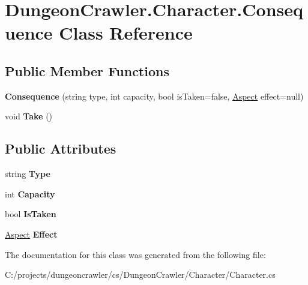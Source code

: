 \hypertarget{class_dungeon_crawler_1_1_character_1_1_consequence}{}\section{Dungeon\+Crawler.\+Character.\+Consequence Class Reference}
\label{class_dungeon_crawler_1_1_character_1_1_consequence}
\subsection*{Public Member Functions}
\begin{DoxyCompactItemize}
\item 
\hypertarget{class_dungeon_crawler_1_1_character_1_1_consequence_a431c8a66e72ae85fac1faebc6d4068a0}{}{\bfseries Consequence} (string type, int capacity, bool is\+Taken=false, \hyperlink{class_dungeon_crawler_1_1_core_1_1_aspect}{Aspect} effect=null)\label{class_dungeon_crawler_1_1_character_1_1_consequence_a431c8a66e72ae85fac1faebc6d4068a0}

\item 
\hypertarget{class_dungeon_crawler_1_1_character_1_1_consequence_ad9944b48d59878f68d5339ba5add1db5}{}void {\bfseries Take} ()\label{class_dungeon_crawler_1_1_character_1_1_consequence_ad9944b48d59878f68d5339ba5add1db5}

\end{DoxyCompactItemize}
\subsection*{Public Attributes}
\begin{DoxyCompactItemize}
\item 
\hypertarget{class_dungeon_crawler_1_1_character_1_1_consequence_afc2e03283729c13bb9971390d382d517}{}string {\bfseries Type}\label{class_dungeon_crawler_1_1_character_1_1_consequence_afc2e03283729c13bb9971390d382d517}

\item 
\hypertarget{class_dungeon_crawler_1_1_character_1_1_consequence_ab6931c76cc48bf013f71a7128df9decf}{}int {\bfseries Capacity}\label{class_dungeon_crawler_1_1_character_1_1_consequence_ab6931c76cc48bf013f71a7128df9decf}

\item 
\hypertarget{class_dungeon_crawler_1_1_character_1_1_consequence_ab01e2cf751dff41dc90dd550991e8dda}{}bool {\bfseries Is\+Taken}\label{class_dungeon_crawler_1_1_character_1_1_consequence_ab01e2cf751dff41dc90dd550991e8dda}

\item 
\hypertarget{class_dungeon_crawler_1_1_character_1_1_consequence_aef0467da62c63e37bf27527dded9871f}{}\hyperlink{class_dungeon_crawler_1_1_core_1_1_aspect}{Aspect} {\bfseries Effect}\label{class_dungeon_crawler_1_1_character_1_1_consequence_aef0467da62c63e37bf27527dded9871f}

\end{DoxyCompactItemize}


The documentation for this class was generated from the following file\+:\begin{DoxyCompactItemize}
\item 
C\+:/projects/dungeoncrawler/cs/\+Dungeon\+Crawler/\+Character/Character.\+cs\end{DoxyCompactItemize}
